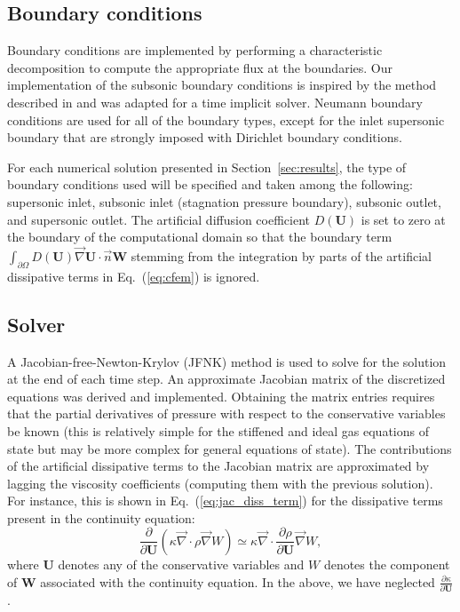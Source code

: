 \documentclass[preprint,10pt]{elsarticle}
\renewcommand{\div}{\vec{\nabla}\! \cdot \!}
\newcommand{\grad}{\vec{\nabla}}
\newcommand{\eqt}[1]{Eq.~(\ref{#1})}                     %
\newcommand{\sct}[1]{Section~\ref{#1}}                   %
\newcommand{\tcr}[1]{\textcolor{red}{#1}}
\newcommand{\tcb}[1]{\textcolor{blue}{#1}}
\begin{document}
\subsection{Boundary conditions} \label{sec:bc}
Boundary conditions are implemented by performing a characteristic decomposition to compute the 
appropriate flux at the boundaries.
Our implementation of the subsonic boundary conditions is inspired by the method described in \cite{SEM} 
and was adapted for a time implicit solver. Neumann boundary conditions are used for all of the 
boundary types, except for the inlet supersonic boundary that are strongly imposed with Dirichlet boundary conditions.

For each numerical solution presented in \sct{sec:results}, the type of boundary conditions used 
will be specified and taken among the following: supersonic inlet, subsonic inlet (stagnation pressure boundary), 
subsonic outlet, and supersonic outlet. 
The artificial diffusion coefficient $D(\mathbf  U)$ is set to zero at the boundary of the computational 
domain so that the boundary term 
$\int_{\partial \Omega} D(\mathbf  U) \grad \mathbf  U \cdot \vec{n} \mathbf W$ stemming from the 
integration by parts of the artificial dissipative terms in \eqt{eq:cfem} is ignored.

\subsection{Solver} \label{sec:solver}
A Jacobian-free-Newton-Krylov (JFNK) method is used to solve for the solution at the end of each time step. 
An approximate Jacobian matrix of the discretized equations was derived and implemented. Obtaining the 
matrix entries requires that the partial derivatives of pressure with respect to the conservative variables 
be known (this is relatively simple for the stiffened and ideal gas equations of state but may be more 
complex for general equations of state). The contributions of the artificial dissipative terms to the 
Jacobian matrix are approximated by lagging the viscosity coefficients (computing them with the previous solution). 
For instance, this is shown in \eqt{eq:jac_diss_term} for the dissipative terms present in the continuity equation:
\begin{equation}
\label{eq:jac_diss_term}
\frac{\partial}{\partial \mathbf U} \left( \kappa \div \rho \grad W \right) \simeq \kappa \div \frac{\partial \rho}{\partial \mathbf U} \grad W ,
\end{equation}  
where $\mathbf  U$ denotes any of the conservative variables and $W$ denotes the component of $\mathbf  W$ associated with the 
continuity equation. In the above, we have neglected $\frac{\partial \kappa}{\partial \mathbf U}$.
\end{document}

